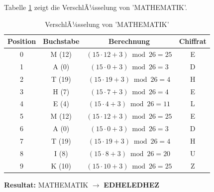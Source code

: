 ﻿\documentclass[12pt,a4paper]{article}
\begin{document}
	Tabelle \ref{tab:maths} zeigt die VerschlÃ¼sselung von 'MATHEMATIK'. 
	\begin{table}[H]
		\caption{VerschlÃ¼sselung von 'MATHEMATIK'}
		\label{tab:maths}
		\centering
		\begin{tabular}{|c|c|c|c|}
			\hline
			\textbf{Position} & \textbf{Buchstabe} & \textbf{Berechnung} & \textbf{Chiffrat} \\
			\hline
			0 & M (12) & $(15 \cdot 12 + 3) \bmod 26 = 25$ & E \\
			1 & A (0) & $(15 \cdot 0 + 3) \bmod 26 = 3$ & D \\
			2 & T (19) & $(15 \cdot 19 + 3) \bmod 26 = 4$ & H \\
			3 & H (7) & $(15 \cdot 7 + 3) \bmod 26 = 4$ & E \\
			4 & E (4) & $(15 \cdot 4 + 3) \bmod 26 = 11$ & L \\
			5 & M (12) & $(15 \cdot 12 + 3) \bmod 26 = 25$ & E \\
			6 & A (0) & $(15 \cdot 0 + 3) \bmod 26 = 3$ & D \\
			7 & T (19) & $(15 \cdot 19 + 3) \bmod 26 = 4$ & H \\
			8 & I (8) & $(15 \cdot 8 + 3) \bmod 26 = 20$ & U \\
			9 & K (10) & $(15 \cdot 10 + 3) \bmod 26 = 25$ & Z \\
			\hline
		\end{tabular}
	\end{table}
	\textbf{Resultat:} MATHEMATIK $\to$ \textbf{EDHELEDHEZ}
	
\end{document}

